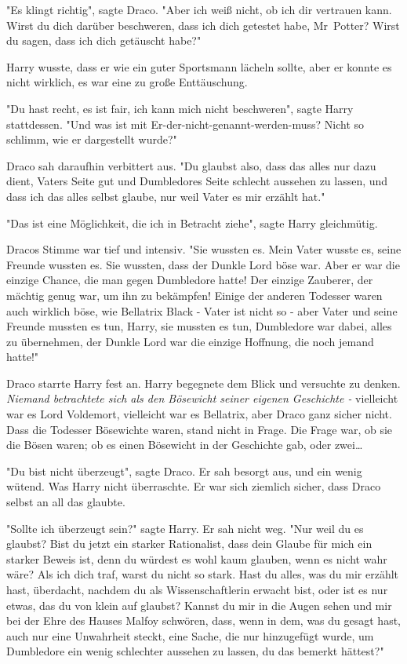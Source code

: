 {"Es klingt richtig", sagte Draco. "Aber ich weiß nicht, ob ich dir vertrauen kann. Wirst du dich darüber beschweren, dass ich dich getestet habe, Mr~Potter? Wirst du sagen, dass ich dich getäuscht habe?"

Harry wusste, dass er wie ein guter Sportsmann lächeln sollte, aber er konnte es nicht wirklich, es war eine zu große Enttäuschung.

"Du hast recht, es ist fair, ich kann mich nicht beschweren", sagte Harry stattdessen. "Und was ist mit Er-der-nicht-genannt-werden-muss? Nicht so schlimm, wie er dargestellt wurde?"

Draco sah daraufhin verbittert aus. "Du glaubst also, dass das alles nur dazu dient, Vaters Seite gut und Dumbledores Seite schlecht aussehen zu lassen, und dass ich das alles selbst glaube, nur weil Vater es mir erzählt hat."

"Das ist eine Möglichkeit, die ich in Betracht ziehe", sagte Harry gleichmütig.

Dracos Stimme war tief und intensiv. "Sie wussten es. Mein Vater wusste es, seine Freunde wussten es. Sie wussten, dass der Dunkle Lord böse war. Aber er war die einzige Chance, die man gegen Dumbledore hatte! Der einzige Zauberer, der mächtig genug war, um ihn zu bekämpfen! Einige der anderen Todesser waren auch wirklich böse, wie Bellatrix Black - Vater ist nicht so - aber Vater und seine Freunde mussten es tun, Harry, sie mussten es tun, Dumbledore war dabei, alles zu übernehmen, der Dunkle Lord war die einzige Hoffnung, die noch jemand hatte!"

Draco starrte Harry fest an. Harry begegnete dem Blick und versuchte zu denken. \emph{Niemand betrachtete sich als den Bösewicht seiner eigenen Geschichte -} vielleicht war es Lord Voldemort, vielleicht war es Bellatrix, aber Draco ganz sicher nicht. Dass die Todesser Bösewichte waren, stand nicht in Frage. Die Frage war, ob sie die Bösen waren; ob es einen Bösewicht in der Geschichte gab, oder zwei…

"Du bist nicht überzeugt", sagte Draco. Er sah besorgt aus, und ein wenig wütend. Was Harry nicht überraschte. Er war sich ziemlich sicher, dass Draco selbst an all das glaubte.

"Sollte ich überzeugt sein?" sagte Harry. Er sah nicht weg. "Nur weil du es glaubst? Bist du jetzt ein starker Rationalist, dass dein Glaube für mich ein starker Beweis ist, denn du würdest es wohl kaum glauben, wenn es nicht wahr wäre? Als ich dich traf, warst du nicht so stark. Hast du alles, was du mir erzählt hast, überdacht, nachdem du als Wissenschaftlerin erwacht bist, oder ist es nur etwas, das du von klein auf glaubst? Kannst du mir in die Augen sehen und mir bei der Ehre des Hauses Malfoy schwören, dass, wenn in dem, was du gesagt hast, auch nur eine Unwahrheit steckt, eine Sache, die nur hinzugefügt wurde, um Dumbledore ein wenig schlechter aussehen zu lassen, du das bemerkt hättest?"

}
